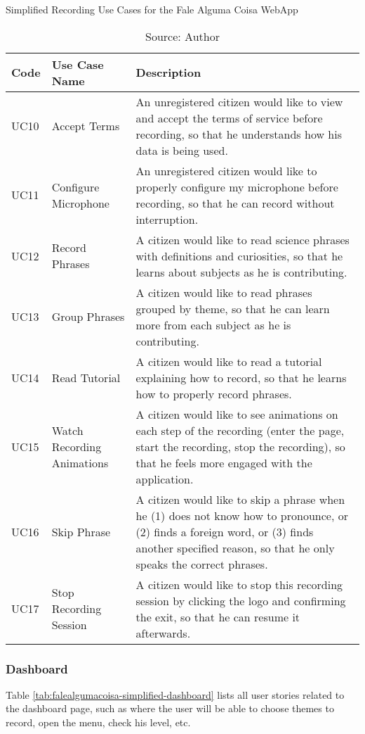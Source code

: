 \begin{table}[h]
\caption{Simplified Recording Use Cases for the Fale Alguma Coisa WebApp}
\label{tab:falealgumacoisa-simplified-recording}
\centering
\begin{tabular}{|p{1cm}|p{3cm}|p{10cm}|}
\hline
    Code & Use Case Name & Description \\ \hline
    UC10 & Accept Terms & An unregistered citizen would like to view and accept the terms of service before recording, so that he understands how his data is being used. \\ \hline
    UC11 & Configure Microphone & An unregistered citizen would like to properly configure my microphone before recording, so that he can record without interruption. \\ \hline
    UC12 & Record Phrases & A citizen would like to read science phrases with definitions and curiosities, so that he learns about subjects as he is contributing. \\ \hline
    UC13 & Group Phrases & A citizen would like to read phrases grouped by theme, so that he can learn more from each subject as he is contributing. \\ \hline
    UC14 & Read Tutorial & A citizen would like to read a tutorial explaining how to record, so that he learns how to properly record phrases. \\ \hline
    UC15 & Watch Recording Animations & A citizen would like to see animations on each step of the recording (enter the page, start the recording, stop the recording), so that he feels more engaged with the application. \\ \hline
    UC16 & Skip Phrase & A citizen would like to skip a phrase when he (1) does not know how to pronounce, or (2) finds a foreign word, or (3) finds another specified reason, so that he only speaks the correct phrases. \\ \hline
    UC17 & Stop Recording Session & A citizen would like to stop this recording session by clicking the logo and confirming the exit, so that he can resume it afterwards. \\ \hline
\end{tabular}
\caption*{Source: Author}
\end{table}

\clearpage
\subsubsection{Dashboard}

Table \ref{tab:falealgumacoisa-simplified-dashboard} lists all user stories related to the dashboard page, such as where the user will be able to choose themes to record, open the menu, check his level, etc.

